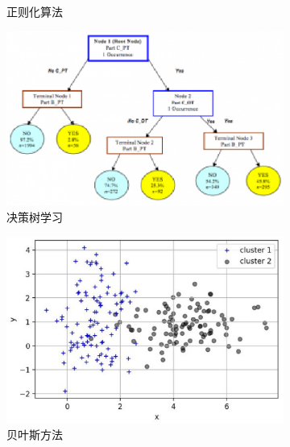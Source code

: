 \begin{figure}[htp]
\begin{subfigure}{.33\textwidth}
		 \caption{正则化算法}
		 \label{fig:2.sub.33}
	 \end{subfigure}%

	 \medskip
	 \begin{subfigure}{.33\textwidth}
	   \centering
	   \includegraphics[width=\linewidth]{imgs/2.1.4.eps}
	   \caption{决策树学习}
	   \label{fig:2.sub.4}
	 \end{subfigure}\hfil%
	 \begin{subfigure}{.33\textwidth}
	   \centering
	   \includegraphics[width=\linewidth]{imgs/2.1.5.eps}
	   \caption{贝叶斯方法}
	   \label{fig:2.sub.5}
	 \end{subfigure}\hfil%
	 \begin{subfigure}{.33\textwidth}
	   \centering

\end{subfigure}
\end{figure}

